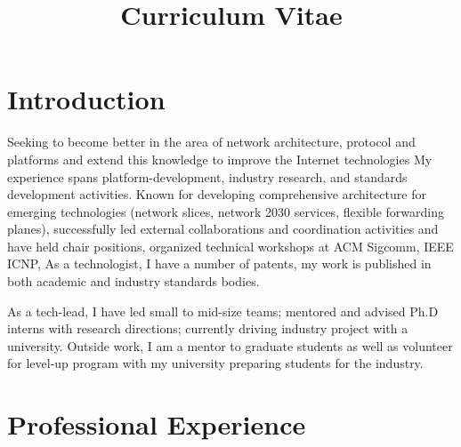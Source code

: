 \documentclass[11pt,a4paper,sans]{moderncv} %
\title{Curriculum Vitae}
\begin{document}
\makecvtitle %

\section{Introduction}
 {Seeking to become better in the area of network architecture, protocol and platforms and extend this knowledge to improve the  Internet technologies}
 {My experience spans platform-development, industry research, and standards development activities. Known for developing comprehensive architecture for emerging technologies (network slices, network 2030 services, flexible forwarding planes), successfully led external collaborations and coordination activities and have held chair positions, organized technical workshops at ACM Sigcomm, IEEE ICNP, \newline As a technologist, I have a number of patents, my work is published in both academic and industry standards bodies.} 

  { As a tech-lead, I have led small to mid-size teams; mentored and advised Ph.D interns with research directions; currently driving industry project with a university. Outside work, I am a mentor to graduate students as well as volunteer for level-up program with my university  preparing students for the industry.}




  
\section{Professional Experience}
\end{document}
